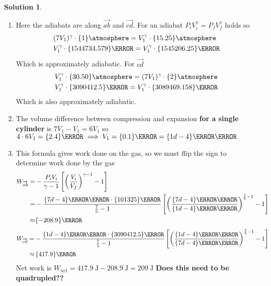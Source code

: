 \documentclass[10pt]{article}
\theoremstyle{definition}
\newtheorem{soln}{Solution}
\begin{document}
\begin{soln} ~
  \begin{enumerate}[label=(\alph*)]
    \item Here the adiabats are along $\overrightarrow{ab}$ and $\overrightarrow{cd}$. For an adiabat $P_iV_i^\gamma=P_fV_f^\gamma$ holds so
          \begin{align*}
             & (7V_1)^\gamma\cdot\qty{1}{\atmosphere}=V_1^\gamma\cdot\qty{15.25}{\atmosphere}     \\
             & V_1^\gamma\cdot\qty{1544734.579}{\pascal}=V_1^\gamma\cdot\qty{1545206.25}{\pascal}
          \end{align*}
          Which is approximately adiabatic. For $\overrightarrow{cd}$
          \begin{align*}
             & V_1^\gamma\cdot\qty{30.50}{\atmosphere}=(7V_1)^\gamma\cdot\qty{2}{\atmosphere}    \\
             & V_1^\gamma\cdot\qty{3090412.5}{\pascal}=V_1^\gamma\cdot\qty{3089469.158}{\pascal}
          \end{align*}
          Which is also approximately adiabatic.
    \item The volume difference between compression and expansion \textbf{for a single cylinder} is $7V_1-V_1=6V_1$ so $4\cdot6V_1=\qty{2.4}{\liter}\implies V_1=\qty{0.1}{\liter}=\qty{1d-4}{\meter\cubed}$
    \item This formula gives work done on the gas, so we must flip the sign to determine work done by the gas
          \begin{align*}
            W_{\overrightarrow{ab}}= & -\frac{P_iV_i}{\gamma-1} \left[\left(\frac{V_i}{V_f}\right)^{\gamma-1}-1\right]                                                                                                 \\
            =                        & -\frac{\qty{7d-4}{\meter\cubed}\cdot\qty{101325}{\pascal}}{\frac{7}{5}-1} \left[\left(\frac{\qty{7d-4}{\meter\cubed}}{\qty{1d-4}{\meter\cubed}}\right)^{\frac{7}{5}-1}-1\right] \\
            \approx                  & \qty{-208.9}{\joule}
          \end{align*}
          \begin{align*}
            W_{\overrightarrow{cd}}= & -\frac{\qty{1d-4}{\meter\cubed}\cdot\qty{3090412.5}{\pascal}}{\frac{7}{5}-1} \left[\left(\frac{\qty{1d-4}{\meter\cubed}}{\qty{7d-4}{\meter\cubed}}\right)^{\frac{7}{5}-1}-1\right] \\
            \approx                  & \,\qty{417.9}{\joule}                                                                                                                                                                \\
          \end{align*}
          Net work is $W_{net}=\qty{417.9}{\joule}-\qty{208.9}{\joule}=\qty{209}{\joule}$ \textbf{Does this need to be quadrupled??}
  \end{enumerate}
\end{soln}
\newpage
\end{document}

